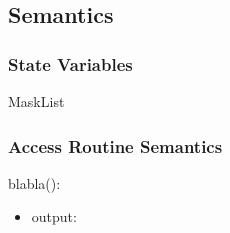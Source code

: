 \documentclass[12pt, titlepage]{article}
\begin{document}
\subsection{Semantics}

\subsubsection{State Variables}

MaskList

\subsubsection{Access Routine Semantics}
\noindent blabla():
\begin{itemize}
\item output: 
\end{itemize}

\fi

\newpage



\end{document}

